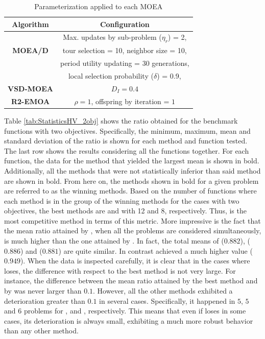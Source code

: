 %
\begin{table}[t]
\centering
\caption{ Parameterization applied to each MOEA}
\label{tab:Parametrization}
\begin{tabular}{c|c}
\hline
\textbf{Algorithm} & \textbf{Configuration} \\ \hline
\multirow{3}{*}{\textbf{MOEA/D}} &Max. updates by sub-problem ($\eta_r$) = 2, \\
 & tour selection = 10,   neighbor size = 10, \\
 & period utility updating = 30 generations, \\ 
 & local selection probability ($\delta$) = 0.9,\\ \hline
\textbf{VSD-MOEA} & $D_I=0.4$ \\ \hline
\textbf{R2-EMOA} & $\rho=1$, offspring by iteration = $1$ \\ \hline
\end{tabular}
\end{table}







Table \ref{tab:StatisticsHV_2obj} shows the \HV{} ratio obtained for the benchmark functions
with two objectives.
%
Specifically, the minimum, maximum, mean and standard deviation of the \HV{} ratio is shown for each method and function tested.
%
The last row shows the results considering all the functions together.
%
For each function, the data for the method that yielded the largest mean is shown in bold.
%
Additionally, all the methods that were not statistically inferior than said method are shown in bold.
%
From here on, the methods shown in bold for a given problem are referred to as the winning methods.
%
Based on the number of functions where each method is in the group of the winning methods for the cases 
with two objectives, the best methods are \VSDMOEA{} and \RMOEA{} with 12 and 8, respectively.
%
Thus, \VSDMOEA{} is the most competitive method in terms of this metric.
%
More impressive is the fact that the mean \HV{} ratio attained by \VSDMOEA{}, when all the problems are considered simultaneously, is much higher
than the one attained by \RMOEA{}.
%
In fact, the total means of \RMOEA{} ($0.882$), \NSGAII{} ($0.886$) and \MOEAD{} ($0.881$) are quite similar.
%
In contrast \VSDMOEA{} achieved a much higher value ($0.949$).
%
When the data is inspected carefully, it is clear that in the cases where \VSDMOEA{} loses, the difference with respect to the
best method is not very large.
%
For instance, the difference between the mean \HV{} ratio attained by the best method and by \VSDMOEA{} was never larger
than $0.1$.
%
However, all the other methods exhibited a deterioration greater than $0.1$ in several cases.
%
Specifically, it happened in $5$, $5$ and $6$ problems for \RMOEA{}, \NSGAII{} and \MOEAD{}, respectively.
%
This means that even if \VSDMOEA{} loses in some cases, its deterioration is always small, exhibiting a much more 
robust behavior than any other method.

